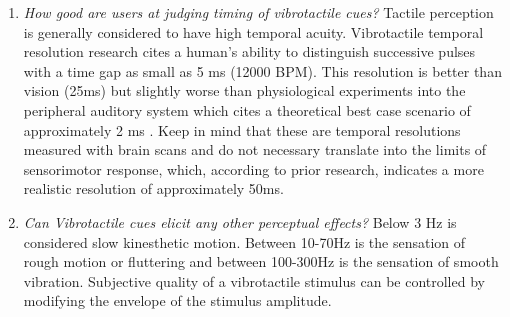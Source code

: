 \begin{enumerate}
    \item \emph{How good are users at judging timing of vibrotactile cues?}
Tactile perception is generally considered to have high temporal acuity.
Vibrotactile temporal resolution research cites a human's ability to distinguish successive pulses with a time gap as small as 5 ms (12000 BPM). This resolution is better than vision (25ms) but slightly worse than physiological experiments into the peripheral auditory system which cites a theoretical best case scenario of approximately 2 ms \cite{fishbach2001auditory} \cite{parsons2006neurobiology}. Keep in mind that these are temporal resolutions measured with brain scans and do not necessary translate into the limits of sensorimotor response, which, according to prior research, indicates a more realistic resolution of approximately 50ms.
    \item \emph{Can Vibrotactile cues elicit any other perceptual effects?} Below 3 Hz is considered slow kinesthetic motion. Between 10-70Hz is the sensation of rough motion or fluttering and between 100-300Hz is the sensation of smooth vibration. Subjective quality of a vibrotactile stimulus can be controlled by modifying the envelope of the stimulus amplitude.
\end{enumerate}

